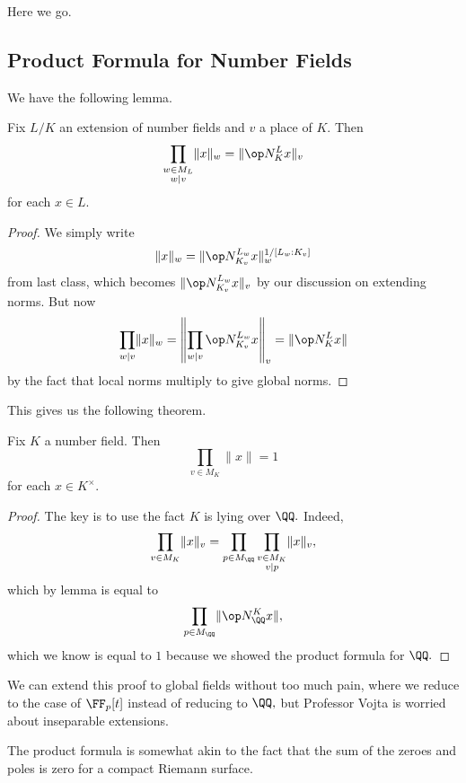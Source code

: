 













Here we go.

\subsection{Product Formula for Number Fields}
We have the following lemma.
\begin{lemma}
	Fix $L/K$ an extension of number fields and $v$ a place of $K.$ Then
	\[\prod_{\substack{w\in M_L\\w\mid v}}\lVert x\rVert_w=\lVert\op N_K^Lx\rVert_v\]
	for each $x\in L.$
\end{lemma}
\begin{proof}
	We simply write
	\[\lVert x\rVert_w=\lVert\op N_{K_v}^{L_w}x\rVert_w^{1/[L_w:K_v]}\]
	from last class, which becomes $\lVert\op N_{K_v}^{L_w}x\rVert_v$ by our discussion on extending norms. But now
	\[\prod_{w\mid v}\lVert x\rVert_w=\left\lVert\prod_{w\mid v}\op N_{K_v}^{L_w}x\right\rVert_v=\lVert\op N_K^Lx\rVert\]
	by the fact that local norms multiply to give global norms.
\end{proof}
This gives us the following theorem.
\begin{theorem}
	Fix $K$ a number field. Then
	\[\prod_{v\in M_K}\lVert x\rVert=1\]
	for each $x\in K^\times.$
\end{theorem}
\begin{proof}
	The key is to use the fact $K$ is lying over $\QQ.$ Indeed,
	\[\prod_{v\in M_K}\lVert x\rVert_v=\prod_{p\in M_\QQ}\prod_{\substack{v\in M_K\\v\mid p}}\lVert x\rVert_v,\]
	which by lemma is equal to
	\[\prod_{p\in M_\QQ}\lVert\op N_\QQ^Kx\rVert,\]
	which we know is equal to $1$ because we showed the product formula for $\QQ.$
\end{proof}
\begin{remark}
	We can extend this proof to global fields without too much pain, where we reduce to the case of $\FF_p[t]$ instead of reducing to $\QQ,$ but Professor Vojta is worried about inseparable extensions.
\end{remark}
\begin{remark}
	The product formula is somewhat akin to the fact that the sum of the zeroes and poles is zero for a compact Riemann surface.
\end{remark}

